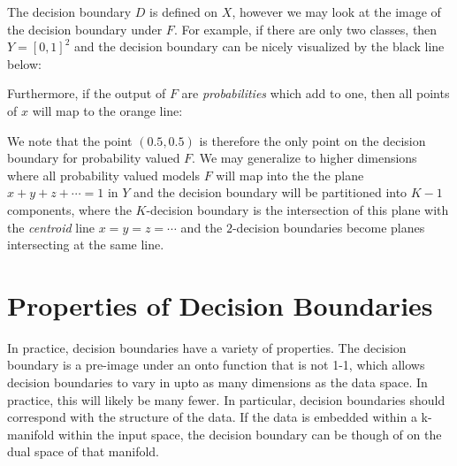 The decision boundary $D$ is defined on $X$, however we may look at the image of the decision boundary under $F$. For example, if there are only two classes, then $Y = [0,1]^2$ and the decision boundary can be nicely visualized by the black line below: 


Furthermore, if the output of $F$ are \emph{probabilities} which add to one, then all points of $x$ will map to the orange line:


We note that the point $(0.5, 0.5)$ is therefore the only point on the decision boundary for probability valued $F$. We may generalize to higher dimensions where all probability valued models $F$ will map into the the plane $x + y + z + \cdots = 1$ in $Y$ and the decision boundary will be partitioned into $K-1$ components, where the $K$-decision boundary is the intersection of this plane with the \emph{centroid} line $x = y = z = \cdots$ and the $2$-decision boundaries become planes intersecting at the same line. 

\section{Properties of Decision Boundaries}

In practice, decision boundaries have a variety of properties. The
decision boundary is a pre-image under an onto function that is not
1-1, which allows decision boundaries to vary in upto as many
dimensions as the data space. In practice, this will likely be many
fewer. In particular, decision boundaries should correspond with the
structure of the data. If the data is embedded within a k-manifold
within the input space, the decision boundary can be though of on the
dual space of that manifold.

